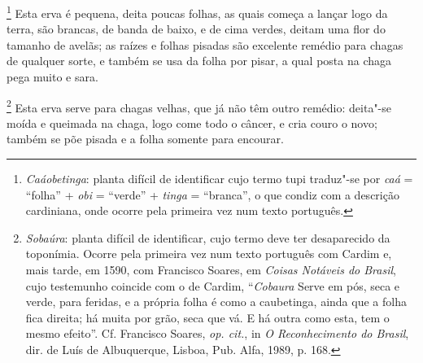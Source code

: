 \footnote{ \textit{Caáobetinga}: planta difícil
de identificar cujo termo tupi traduz"-se por \textit{caá} = ``folha'' +
\textit{obi} = ``verde'' + \textit{tinga} = ``branca'', o que condiz com a
descrição cardiniana, onde ocorre pela primeira vez num texto
português.} Esta erva é pequena, deita poucas folhas, as
quais começa a lançar logo da terra, são brancas, de banda de baixo, e
de cima verdes, deitam uma flor do tamanho de avelãs; as raízes e
folhas pisadas são excelente remédio para chagas de qualquer sorte, e
também se usa da folha por pisar, a qual posta na chaga pega muito e sara.

\footnote{ \textit{Sobaúra}: planta difícil de
identificar, cujo termo deve ter desaparecido da toponímia. Ocorre pela
primeira vez num texto português com Cardim e, mais tarde, em 1590, com
Francisco Soares, em \textit{Coisas Notáveis do Brasil}, cujo
testemunho coincide com o de Cardim, ``\textit{Cobaura} Serve em pós,
seca e verde, para feridas, e a própria folha é como a caubetinga,
ainda que a folha fica direita; há muita por grão, seca que vá. E há
outra como esta, tem o mesmo efeito''. Cf. Francisco Soares,
\textit{op. cit.}, in \textit{O Reconhecimento do Brasil}, dir. de Luís
de Albuquerque, Lisboa, Pub. Alfa, 1989, p. 168.} Esta erva
serve para chagas velhas, que já não têm outro remédio: deita"-se moída
e queimada na chaga, logo come todo o câncer, e cria couro o novo;
também se põe pisada e a folha somente para encourar.


